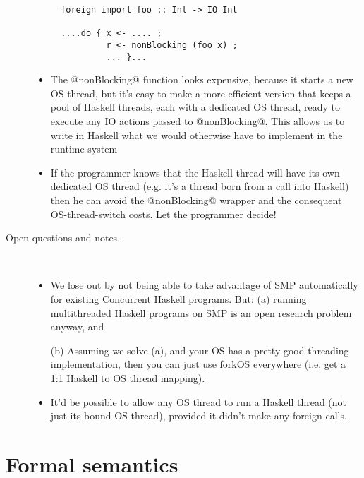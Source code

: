 \documentclass{article}
\begin{document}
\begin{description}
\begin{itemize}
\begin{verbatim}
  foreign import foo :: Int -> IO Int

  ....do { x <- .... ; 
           r <- nonBlocking (foo x) ; 
           ... }...
\end{verbatim}
\item
The @nonBlocking@ function looks expensive, because it starts a new OS thread, but it's easy
to make a more efficient version that keeps a pool of Haskell threads, each with a dedicated 
OS thread, ready to execute any IO actions passed to @nonBlocking@.  This allows us to write in Haskell
what we would otherwise have to implement in the runtime system

\item If the programmer knows that the Haskell thread will have its own dedicated OS thread (e.g.
it's a thread born from a call into Haskell) then he can avoid the @nonBlocking@ wrapper and the
consequent OS-thread-switch costs.  Let
the programmer decide!
\end{itemize}

\item[Open questions and notes.] \mbox{}\\
\begin{itemize}
\item We lose out by not being able to take advantage of SMP automatically 
for existing Concurrent Haskell programs.  But:
  (a) running multithreaded Haskell programs on SMP is an open research
      problem anyway, and

  (b) Assuming we solve (a), and your OS has a pretty good threading
      implementation, then you can just use forkOS everywhere (i.e. get a 1:1
      Haskell to OS thread mapping).

\item 
It'd be possible to allow any OS thread to run a Haskell thread (not just its bound OS thread),
provided it didn't make any foreign calls.  
\end{itemize}
\end{description}


\section{Formal semantics}
\end{document}
